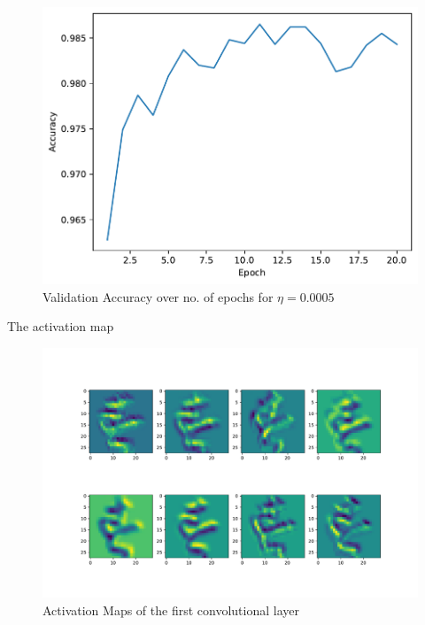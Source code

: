 \begin{questions}
        \begin{figure}[H]
            \centering
            \includegraphics[scale=0.6]{CNN-validation-accuracy-0.0005-0.3-0-adam.pdf}
            \caption{Validation Accuracy over no. of epochs for $\eta = 0.0005$}
            \label{}
        \end{figure}

        \question
        The activation map 

        \begin{figure}[H]
            \centering
            \includegraphics[scale=0.4]{activation_maps.pdf}
            \caption{Activation Maps of the first convolutional layer}
            \label{fig:activation}
        \end{figure}


\end{questions}
